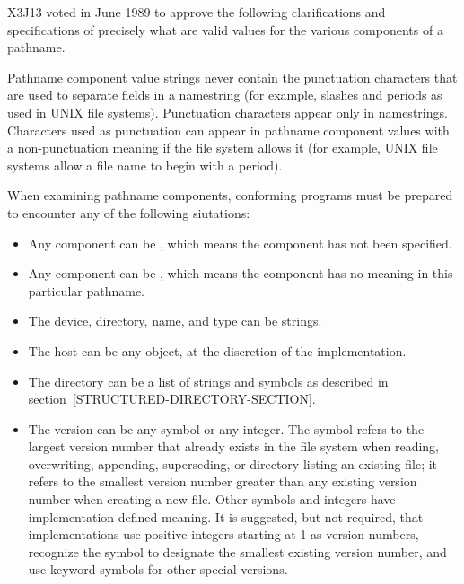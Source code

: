 \begin{newer}
X3J13 voted in June 1989 
to approve the following clarifications and specifications
of precisely what are valid values for the various components
of a pathname.

\makeatletter
\def\@listi{\leftmargin\leftmargini \labelsep\leftmargin
   \parsep 3pt\relax
   \topsep 2pt plus 5pt\relax
   \itemsep\topsep}
\makeatother

  Pathname component value strings never contain the punctuation
  characters that are used to separate fields in a namestring (for example,
  slashes and
  periods as used in UNIX file systems).  Punctuation characters appear only in namestrings.
  Characters used as punctuation can appear in pathname component values
  with a non-punctuation meaning if the file system allows it (for example,
  UNIX file systems allow a file name to begin with a period).

  When examining pathname components, conforming programs must be prepared
  to encounter any of the following siutations:
  \begin{itemize}
    \item Any component can be , which means the component has not
    been specified.
  
   \item  Any component can be , which means the component has
    no meaning in this particular pathname.
  
   \item  The device, directory, name, and type can be strings.
  
   \item  The host can be any object, at the discretion of the implementation.
  
  \item  The directory can be a list of strings and symbols as described in
    section~\ref{STRUCTURED-DIRECTORY-SECTION}.
  
  \item  The version can be any symbol or any integer.  The symbol 
    refers to the largest version number that already exists in the file
    system when reading, overwriting, appending, superseding, or
    directory-listing an existing file; it refers to the smallest version number
    greater than any existing version number when creating a new file.
    Other symbols and integers have implementation-defined meaning.
    It is suggested, but not required, that implementations use positive
    integers starting at 1 as version numbers, recognize the symbol 
    to designate the smallest existing version number, and use keyword
    symbols for other special versions.
  \end{itemize}


\end{newer}
